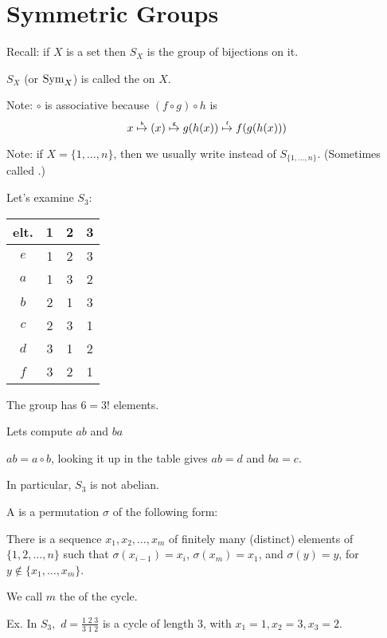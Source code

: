 \documentclass[notes.tex]{subfiles}
\begin{document}
\chapter*{Symmetric Groups}

Recall: if $X$ is a set then $S_X$ is the group of bijections on it.
\begin{definition}
	$S_X$ (or $\mathrm{Sym}_X$) is called the  on $X$.
\end{definition}

Note: $\circ$ is associative because $(f\circ g) \circ h$ is $$x\overop{\mapsto}{h}(x)\overop\mapsto{g}g(h(x))\overop\mapsto{f}f(g(h(x)))$$

Note: if $X = \{1, \ldots, n\}$, then we usually write  instead of $S_{\{1, \ldots, n\}}$. (Sometimes called .)

Let's examine $S_3$:

\begin{tabular}{c|ccc}
elt. & 1 & 2 & 3\\\hline
$e$ & 1 & 2 & 3\\
$a$ & 1 & 3 & 2\\
$b$ & 2 & 1 & 3\\
$c$ & 2 & 3 & 1\\
$d$ & 3 & 1 & 2\\
$f$ & 3 & 2 & 1
\end{tabular}

The group has $6 = 3!$ elements.

Lets compute $ab$ and $ba$

$ab = a\circ b$, looking it up in the table gives $ab = d$
 and $ba = c$.

In particular, $S_3$ is not abelian.


\begin{definition}
\label{cycledef}
	A  is a permutation $\sigma$ of the following form:
\end{definition}

There is a sequence $x_1, x_2,\ldots, x_m$ of finitely many (distinct)
elements of $\{1, 2, \ldots, n\}$ such that $\sigma(x_{i-1}) = x_i$, $\sigma(x_m) = x_1$, and $\sigma(y)= y$, for $y\notin \{x_1, \ldots, x_m\}$.

We call $m$ the  of the cycle.

\vspace{0.5em}
Ex. In $S_3,$ $d = \frac{1\;2\;3}{3\;1\;2}$ is a cycle of length 3, with $x_1 =1, x_2=3, x_3=2$.
\end{document}
